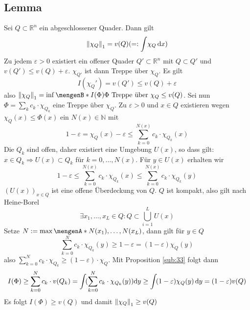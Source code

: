 \subsection[{Lemma: Volumen eines abgeschlossenen Quaders $Q$ entspricht $\norm[1]{\chi_Q} $}]{Lemma} %
\label{sub:310}
Sei $Q \subset \mathds{R}^n$ ein abgeschlossener Quader. Dann gilt 
\[
	\norm[1]{\chi_Q} = v(Q) \enbrace{=: \int\! \chi_Q  \, \mathrm{d}x  }
\]
Zu jedem $\varepsilon>0$ existiert ein offener Quader $Q' \subset \mathds{R}^n$ mit $Q \subset Q'$ und $v(Q') \le v(Q) + \varepsilon$. $\chi_{Q'}$ ist dann Treppe über 
$\chi_Q$. Es gilt
\[
	I(\chi_Q') = v(Q') \le v(Q)+ \varepsilon
\]
also $\norm[1]{\chi_Q} = \inf \set[I(\Phi)]{\Phi \text{ Treppe über }\chi_Q} \le v(Q) $. Sei nun $\Phi = \sum_k c_k \cdot \chi_{Q_k}$ eine Treppe über $\chi_Q$. Zu 
$\varepsilon>0$ und $x\in Q$ existieren wegen $\chi_Q (x) \le \Phi(x)$ ein $N(x) \in \mathds{N}$ mit 
\[
	1- \varepsilon = \chi_Q(x) - \varepsilon \le \sum_{k=0}^{N(x)} c_k \cdot \chi_{Q_k}(x)
\]
Die $Q_k$ sind offen, daher existiert eine Umgebung $U(x)$, so dass gilt: $x \in Q_k \Rightarrow U(x) \subset Q_k$ für $k=0,\ldots ,N(x)$. Für $y \in U(x)$ erhalten wir
\[
	1- \varepsilon \le \sum_{k=0}^{N(x)} c_k \cdot \chi_{Q_k}(x) \le \sum_{k=0}^{N(x)} c_k \cdot \chi_{Q_k}(y)  
\]
$(U(x))_{x \in Q}$ ist eine offene Überdeckung von $Q$. $Q$  ist kompakt, also gilt nach Heine-Borel
\[
	\exists x_1, \ldots , x_L \in Q : Q \subset \bigcup_{i=1}^L U(x)
\]
Setze $N := \max \set{N(x_1), \ldots , N(x_L)} $, dann gilt für $y \in Q$
\[
	\sum_{k=0}^{N} c_k \cdot \chi_{Q_k}(y) \ge 1- \varepsilon = (1- \varepsilon) \chi_{Q}(y) 
\]
also $\sum_{k=0}^{N} c_k \cdot \chi_{Q_k} \ge (1-\varepsilon) \cdot \chi_Q $. Mit Proposition \ref{sub:33} folgt dann
\begin{align*}
	I(\Phi) \ge \sum_{k=0}^{N} c_k \cdot v(Q_k) = \int \! (\sum_{k=0}^{N} c_k \cdot \chi_{Q_k}(y) ) \mathrm{d}y  \ge \int\! (1-\varepsilon) \chi_{Q}(y)  \, \mathrm{d}y = (1-\varepsilon) v(Q)
\end{align*}
Es folgt $I(\Phi) \ge v(Q)$ und damit $\norm[1]{\chi_Q} \ge v(Q)$ \bewende

